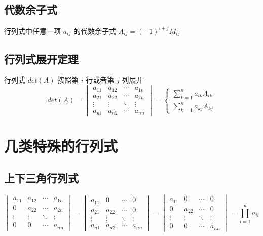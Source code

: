 \subsection{代数余子式}

\begin{definition}[代数余子式]
	行列式中任意一项 $a_{ij}$ 的代数余子式 $A_{ij} = (-1)^{i+j}M_{ij}$
\end{definition}

\subsection{行列式展开定理}
\begin{theorem}[行列式展开定理]

	行列式 $det(A)$ 按照第 $i$ 行或者第 $j$ 列展开
	$$det(A) = \begin{vmatrix}
		a_{11} & a_{12} & \cdots & a_{1n}\\
		a_{21} & a_{22} & \cdots & a_{2n}\\
		\vdots & \vdots & \ddots & \vdots\\
		a_{n1} & a_{n2} & \cdots & a_{nn}
	\end{vmatrix} = 
	\begin{cases}
		\sum\limits_{k=1}^{n} a_{ik}A_{ik} \\
		\sum\limits_{k=1}^{n} a_{kj}A_{kj}
	\end{cases}$$
\end{theorem}

\section{几类特殊的行列式}

\subsection{上下三角行列式}

\begin{corollary}[上下三角行列式]
	$$\begin{vmatrix}
		a_{11} & a_{12} & \cdots & a_{1n}\\
		0      & a_{22} & \cdots & a_{2n}\\
		\vdots & \vdots & \ddots & \vdots\\
		0      & 0      & \cdots & a_{nn}
	\end{vmatrix} = 
	\begin{vmatrix}
		a_{11} & 0      & \cdots & 0\\
		a_{21} & a_{22} & \cdots & 0\\
		\vdots & \vdots & \ddots & \vdots\\
		a_{n1} & a_{n2} & \cdots & a_{nn}
	\end{vmatrix} = 
	\begin{vmatrix}
		a_{11} & 0      & \cdots & 0\\
		0      & a_{22} & \cdots & 0\\
		\vdots & \vdots & \ddots & \vdots\\
		0      & 0      & \cdots & a_{nn}
	\end{vmatrix} = \prod\limits_{i=1}^{n}a_{ii}$$
\end{corollary}
